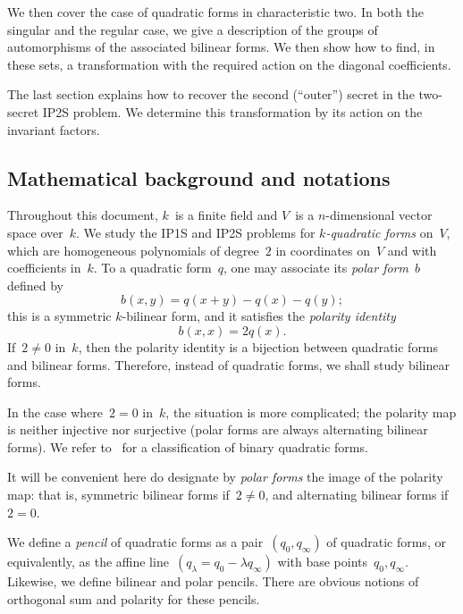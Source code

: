 \documentclass{amsart}
\begin{document}
We then cover the case of quadratic forms in characteristic two.
In both the singular and the regular case,
we give a description of the groups of automorphisms
of the associated bilinear forms.
We then show how to find, in these sets,
a transformation with the required action on the diagonal coefficients.


The last section explains how to recover the second (``outer'') secret
in the two-secret IP2S problem.
We determine this transformation by its action on the invariant factors.

\subsection*{Mathematical background and notations}
Throughout this document, $k$~is a finite field
and $V$~is a $n$-dimensional vector space over~$k$.
We study the IP1S and IP2S problems for \emph{$k$-quadratic forms} on~$V$,
which are homogeneous polynomials of degree~$2$ in coordinates on~$V$
and with coefficients in~$k$.
To a quadratic form~$q$,
one may associate its \emph{polar form}~$b$ defined by
\begin{equation*}\label{eq:polar}
b(x,y) = q(x+y) - q(x) - q(y);
\end{equation*}
this is a symmetric $k$-bilinear form,
and it satisfies the \emph{polarity identity}
\begin{equation*}\label{eq:polarity}
b(x,x) = 2q(x).
\end{equation*}
If~$2 ≠ 0$ in~$k$, then the polarity identity is a bijection between
quadratic forms and bilinear forms.
Therefore, instead of quadratic forms, we shall study bilinear forms.

In the case where~$2 = 0$ in~$k$, the situation is more complicated;
the polarity map is neither injective nor surjective
(polar forms are always alternating bilinear forms).
We refer to~\cite{milnorhusemoller} for a classification of
binary quadratic forms.

It will be convenient here do designate by \emph{polar forms}
the image of the polarity map: that is, symmetric bilinear forms if~$2 ≠ 0$,
and alternating bilinear forms if~$2 = 0$.

\medbreak
We define a \emph{pencil} of quadratic forms
as a pair~$(q_0, q_∞)$ of quadratic forms,
or equivalently, as the affine line~$(q_λ = q_0 - λ q_{∞})$
with base points~$q_0, q_∞$.
Likewise, we define bilinear and polar pencils.
There are obvious notions of orthogonal sum and polarity for these pencils.
\end{document}
